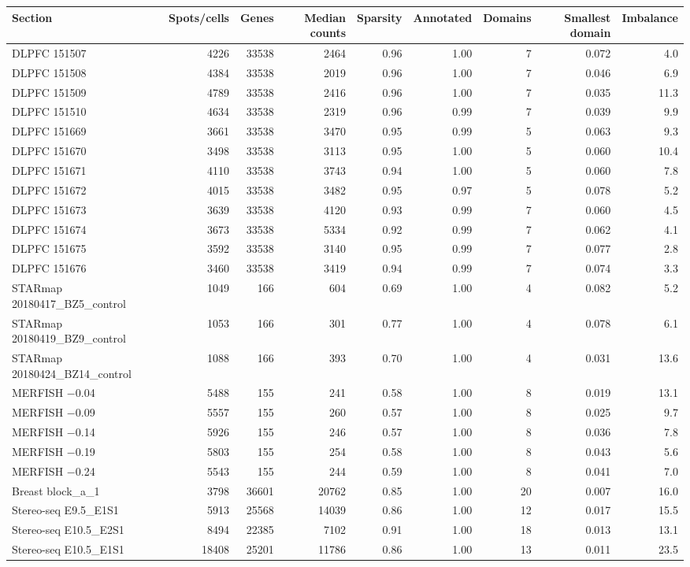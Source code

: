 \scriptsize
\begin{tabular}{lrrrrrrrr}
\toprule
Section & Spots/cells & Genes & Median counts & Sparsity & Annotated & Domains & Smallest domain & Imbalance \\
\midrule
DLPFC 151507 & 4226 & 33538 & 2464 & 0.96 & 1.00 & 7 & 0.072 & 4.0 \\
DLPFC 151508 & 4384 & 33538 & 2019 & 0.96 & 1.00 & 7 & 0.046 & 6.9 \\
DLPFC 151509 & 4789 & 33538 & 2416 & 0.96 & 1.00 & 7 & 0.035 & 11.3 \\
DLPFC 151510 & 4634 & 33538 & 2319 & 0.96 & 0.99 & 7 & 0.039 & 9.9 \\
DLPFC 151669 & 3661 & 33538 & 3470 & 0.95 & 0.99 & 5 & 0.063 & 9.3 \\
DLPFC 151670 & 3498 & 33538 & 3113 & 0.95 & 1.00 & 5 & 0.060 & 10.4 \\
DLPFC 151671 & 4110 & 33538 & 3743 & 0.94 & 1.00 & 5 & 0.060 & 7.8 \\
DLPFC 151672 & 4015 & 33538 & 3482 & 0.95 & 0.97 & 5 & 0.078 & 5.2 \\
DLPFC 151673 & 3639 & 33538 & 4120 & 0.93 & 0.99 & 7 & 0.060 & 4.5 \\
DLPFC 151674 & 3673 & 33538 & 5334 & 0.92 & 0.99 & 7 & 0.062 & 4.1 \\
DLPFC 151675 & 3592 & 33538 & 3140 & 0.95 & 0.99 & 7 & 0.077 & 2.8 \\
DLPFC 151676 & 3460 & 33538 & 3419 & 0.94 & 0.99 & 7 & 0.074 & 3.3 \\
STARmap 20180417\_BZ5\_control & 1049 & 166 & 604 & 0.69 & 1.00 & 4 & 0.082 & 5.2 \\
STARmap 20180419\_BZ9\_control & 1053 & 166 & 301 & 0.77 & 1.00 & 4 & 0.078 & 6.1 \\
STARmap 20180424\_BZ14\_control & 1088 & 166 & 393 & 0.70 & 1.00 & 4 & 0.031 & 13.6 \\
MERFISH $-$0.04 & 5488 & 155 & 241 & 0.58 & 1.00 & 8 & 0.019 & 13.1 \\
MERFISH $-$0.09 & 5557 & 155 & 260 & 0.57 & 1.00 & 8 & 0.025 & 9.7 \\
MERFISH $-$0.14 & 5926 & 155 & 246 & 0.57 & 1.00 & 8 & 0.036 & 7.8 \\
MERFISH $-$0.19 & 5803 & 155 & 254 & 0.58 & 1.00 & 8 & 0.043 & 5.6 \\
MERFISH $-$0.24 & 5543 & 155 & 244 & 0.59 & 1.00 & 8 & 0.041 & 7.0 \\
Breast block\_a\_1 & 3798 & 36601 & 20762 & 0.85 & 1.00 & 20 & 0.007 & 16.0 \\
Stereo-seq E9.5\_E1S1 & 5913 & 25568 & 14039 & 0.86 & 1.00 & 12 & 0.017 & 15.5 \\
Stereo-seq E10.5\_E2S1 & 8494 & 22385 & 7102 & 0.91 & 1.00 & 18 & 0.013 & 13.1 \\
Stereo-seq E10.5\_E1S1 & 18408 & 25201 & 11786 & 0.86 & 1.00 & 13 & 0.011 & 23.5 \\
\bottomrule
\end{tabular}
